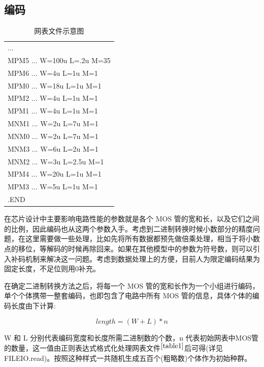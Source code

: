 \documentclass[14pt, a4paper]{article}
\begin{document}
    \subsection{编码}
        \begin{table}[htbp]
            \centering
            \begin{tabular}{|l|}
                \hline
                ... \\
                MPM5 ... W=100u L=.2u M=35 \\
                MPM6 ... W=4u L=1u M=1 \\
                MPM0 ... W=18u L=1u M=1 \\
                MPM2 ... W=4u L=1u M=1 \\
                MPM1 ... W=4u L=1u M=1 \\
                MNM1 ... W=2u L=7u M=1 \\
                MNM0 ... W=2u L=7u M=1 \\
                MNM3 ... W=6u L=2u M=1 \\
                MNM2 ... W=3u L=2.5u M=1 \\
                MPM4 ... W=20u L=1u M=1 \\
                MPM3 ... W=5u L=1u M=1 \\
                .END \\
                \hline
            \end{tabular}
            \caption{网表文件示意图}
            \label{table1}
        \end{table}
        在芯片设计中主要影响电路性能的参数就是各个 MOS 管的宽和长，以及它们之间的比例，因此编码也从这两个参数入手。考虑到二进制转换时候小数部分的精度问题，在这里需要做一些处理，比如先将所有数据都预先做倍乘处理，相当于将小数点的移位，等解码的时候再除回来。如果在其他模型中的参数为符号数，则可以引入补码机制来解决这一问题。考虑到数据处理上的方便，目前人为限定编码结果为固定长度，不足位则用0补充。
        
        在确定二进制转换方法之后，将每一个 MOS 管的宽和长作为一个小组进行编码，单个个体携带一整套编码，也即包含了电路中所有 MOS 管的信息，具体个体的编码长度由下计算:
        
        $$length = (W + L) * n$$
        
        W 和 L 分别代表编码宽度和长度所需二进制数的个数，n 代表初始网表中MOS管的数量，这一值由正则表达式格式化处理网表文件$^{\ref{table1}}$后可得(详见FILEIO.read)。按照这种样式一共随机生成五百个(粗略数)个体作为初始种群。
\end{document}
